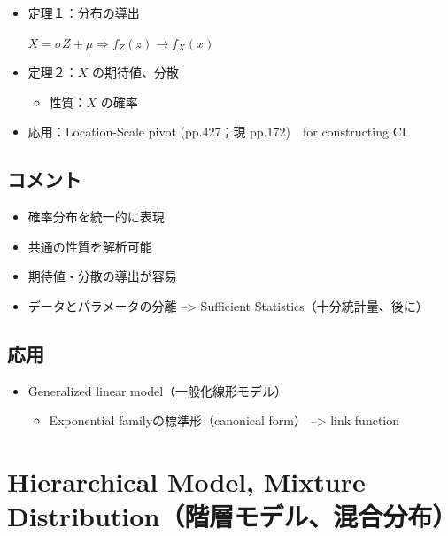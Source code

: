 \documentclass[
]{book}
\providecommand{\tightlist}{%
  \setlength{\itemsep}{0pt}\setlength{\parskip}{0pt}}
\begin{document}
\begin{itemize}
\item
  定理１：分布の導出

  \(X=\sigma Z+\mu \Rightarrow f_Z(z)\rightarrow f_X(x)\)
\item
  定理２：\(X\) の期待値、分散

  \begin{itemize}
  \tightlist
  \item
    性質：\(X\) の確率
  \end{itemize}
\item
  応用：Location-Scale pivot (pp.427；現 pp.172)　for constructing CI
\end{itemize}

\section*{コメント}\label{ux30b3ux30e1ux30f3ux30c8}

\begin{itemize}
\tightlist
\item
  確率分布を統一的に表現
\item
  共通の性質を解析可能
\item
  期待値・分散の導出が容易
\item
  データとパラメータの分離 --\textgreater{} Sufficient Statistics（十分統計量、後に）
\end{itemize}

\section*{応用}\label{ux5fdcux7528}

\begin{itemize}
\tightlist
\item
  Generalized linear model（一般化線形モデル）

  \begin{itemize}
  \tightlist
  \item
    Exponential familyの標準形（canonical form） --\textgreater{} link function
  \end{itemize}
\end{itemize}

\chapter{Hierarchical Model, Mixture Distribution（階層モデル、混合分布）}\label{hierarchical-model-mixture-distributionux968eux5c64ux30e2ux30c7ux30ebux6df7ux5408ux5206ux5e03}
\end{document}
